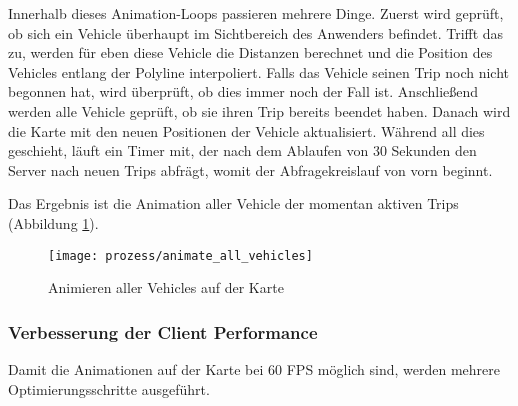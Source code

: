   Innerhalb dieses Animation-Loops passieren mehrere Dinge. Zuerst wird geprüft, ob sich ein Vehicle überhaupt im Sichtbereich des Anwenders befindet. Trifft das zu, werden für eben diese Vehicle die Distanzen berechnet und die Position des Vehicles entlang der Polyline interpoliert. Falls das Vehicle seinen Trip noch nicht begonnen hat, wird überprüft, ob dies immer noch der Fall ist. Anschließend werden alle Vehicle geprüft, ob sie ihren Trip bereits beendet haben. Danach wird die Karte mit den neuen Positionen der Vehicle aktualisiert. Während all dies geschieht, läuft ein Timer mit, der nach dem Ablaufen von 30 Sekunden den Server nach neuen Trips abfrägt, womit der Abfragekreislauf von vorn beginnt.

  Das Ergebnis ist die Animation aller Vehicle der momentan aktiven Trips (Abbildung \ref{fig:prozess/animate_all_vehicles}).

  \begin{figure}[htbp]
    \begin{center}
      \texttt{[image: prozess/animate\_all\_vehicles]}
      \caption{Animieren aller Vehicles auf der Karte}
      \label{fig:prozess/animate_all_vehicles}
    \end{center}
  \end{figure}

  \subsubsection*{Verbesserung der Client Performance}
  \label{ssub:verbesserung_der_client_performance}
    Damit die Animationen auf der Karte bei 60 FPS möglich sind, werden mehrere Optimierungsschritte ausgeführt.

